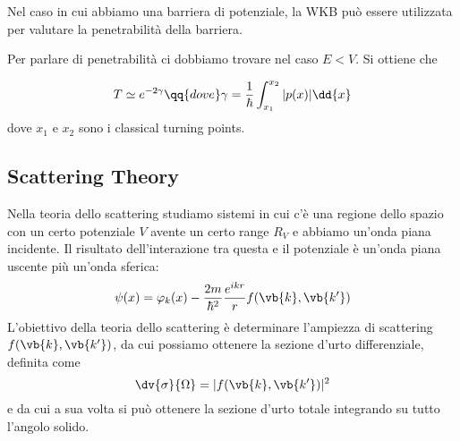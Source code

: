Nel caso in cui abbiamo una barriera di potenziale, la WKB può essere utilizzata per valutare la penetrabilità della barriera.

Per parlare di penetrabilità ci dobbiamo trovare nel caso $E<V$. Si ottiene che

\begin{equation*}
   T \simeq e^{-2\gamma}
   \qq{dove}
   \gamma=\frac{1}{\hbar} \int_{x_1}^{x_2} |p(x)| \dd{x}
\end{equation*}
dove $x_1$ e $x_2$ sono i classical turning points.

\subsection*{Scattering Theory}
Nella teoria dello scattering studiamo sistemi in cui c'è una regione dello spazio con un certo potenziale $V$ avente un certo range $R_V$ e abbiamo un'onda piana incidente. Il risultato dell'interazione tra questa e il potenziale è un'onda piana uscente più un'onda sferica:
\begin{equation*}
   \psi(x)=\varphi_k(x) - \frac{2m}{\hbar^2} \frac{e^{i k r}}{r} f(\vb{k}, \vb{k'})
\end{equation*}
L'obiettivo della teoria dello scattering è determinare l'ampiezza di scattering $f(\vb{k}, \vb{k'})$, da cui possiamo ottenere la sezione d'urto differenziale, definita come
\begin{equation*}
   \dv{\sigma}{\Omega}
   =| f(\vb{k}, \vb{k'}) |^2
\end{equation*}
e da cui a sua volta si può ottenere la sezione d'urto totale integrando su tutto l'angolo solido.
